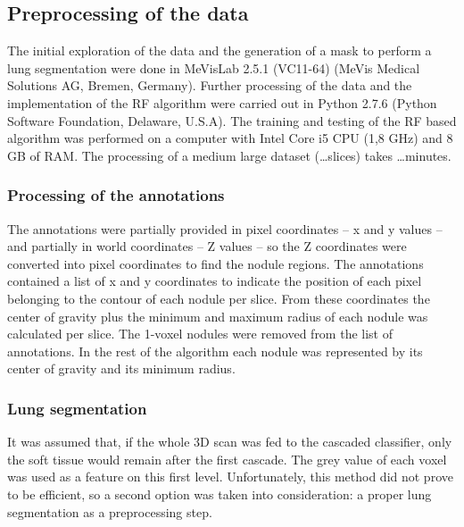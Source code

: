 \subsection{Preprocessing of the data} %
The initial exploration of the data and the generation of a mask to perform a
lung segmentation were done in MeVisLab 2.5.1 (VC11-64) (MeVis Medical Solutions
AG, Bremen, Germany). Further processing of the data and the implementation of
the RF algorithm were carried out in Python 2.7.6 (Python Software Foundation,
Delaware, U.S.A).  The training and testing of the RF based algorithm was
performed on a computer with Intel Core i5 CPU (1,8 GHz) and 8 GB of RAM. The
processing of a medium large dataset (\ldots slices) takes \ldots minutes.

\subsubsection{Processing of the annotations}

The annotations were partially provided in pixel coordinates -- x and y values
-- and partially in world coordinates -- Z values -- so the Z coordinates were
converted into pixel coordinates to find the nodule regions. The annotations
contained a list of x and y coordinates to indicate the position of each pixel
belonging to the contour of each nodule per slice. From these coordinates the
center of gravity plus the minimum and maximum radius of each nodule was
calculated per slice. The 1-voxel nodules were removed from the list of
annotations. In the rest of the algorithm each nodule was represented by its
center of gravity and its minimum radius.

\subsubsection{Lung segmentation}
It was assumed that, if the whole 3D scan was fed to the cascaded classifier,
only the soft tissue would remain after the first cascade. The grey value of
each voxel was used as a feature on this first level. Unfortunately, this method
did not prove to be efficient, so a second option was taken into consideration:
a proper lung segmentation as a preprocessing step.

